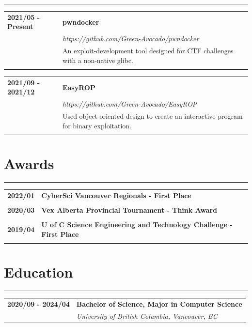 \documentclass[letterpaper]{article}
\newcommand{\horizontalLine}{%
    {\color{cyan}
    \rule{\textwidth}{1pt}
    \vspace{-1ex}}
}
\begin{document}
        \horizontalLine

        \begin{tabular}{p{} p{}} 
            \textbf{2021/05 - Present} & \large\textbf{pwndocker} \\
            & \emph{https://github.com/Green-Avocado/pwndocker} \\
            & An exploit-development tool designed for CTF challenges with a non-native glibc. \\
            \\
        \end{tabular}

        \begin{tabular}{p{} p{}} 
            \textbf{2021/09 - 2021/12} & \large\textbf{EasyROP} \\
            & \emph{https://github.com/Green-Avocado/EasyROP} \\
            & Used object-oriented design to create an interactive program for binary exploitation. \\
            \\
        \end{tabular}

    \section*{Awards}

        \horizontalLine

        \begin{tabular}{p{} p{}} 
            \textbf{2022/01} & \large\textbf{CyberSci Vancouver Regionals - First Place} \\
            \\
            \textbf{2020/03} & \large\textbf{Vex Alberta Provincial Tournament - Think Award} \\
            \\
            \textbf{2019/04} & \large\textbf{U of C Science Engineering and Technology Challenge - First Place} \\
            \\
        \end{tabular}

    \section*{Education}

        \horizontalLine

        \begin{tabular}{p{} p{}} 
            \textbf{2020/09 - 2024/04} & \large\textbf{Bachelor of Science, Major in Computer Science} \\
            & \emph{University of British Columbia, Vancouver, BC} \\
        \end{tabular}
\end{document}
